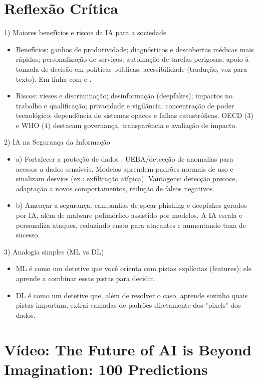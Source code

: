 \documentclass[a4paper,12pt]{article}
\begin{document}
\section{Reflexão Crítica}

1) Maiores benefícios e riscos da IA para a sociedade
\begin{itemize}
\item Benefícios: ganhos de produtividade; diagnósticos e descobertas médicas mais rápidos; personalização de serviços; automação de tarefas perigosas; apoio à tomada de decisão em políticas públicas; acessibilidade (tradução, voz para texto). Em linha com \cite{oecd2019} e \cite{who2021}.
\item Riscos: vieses e discriminação; desinformação (deepfakes); impactos no trabalho e qualificação; privacidade e vigilância; concentração de poder tecnológico; dependência de sistemas opacos e falhas catastróficas. OECD (3) e WHO (4) destacam governança, transparência e avaliação de impacto.
\end{itemize}

2) IA na Segurança da Informação
\begin{itemize}
\item a) Fortalecer a proteção de dados \cite{stamp2022}: UEBA/detecção de anomalias para acessos a dados sensíveis. Modelos aprendem padrões normais de uso e sinalizam desvios (ex.: exfiltração atípica). Vantagens: detecção precoce, adaptação a novos comportamentos, redução de falsos negativos.
\item b) Ameaçar a segurança: campanhas de spear‑phishing e deepfakes gerados por IA, além de malware polimórfico assistido por modelos. A IA escala e personaliza ataques, reduzindo custo para atacantes e aumentando taxa de sucesso.
\end{itemize}

3) Analogia simples (ML vs DL)
\begin{itemize}
\item ML é como um detetive que você orienta com pistas explícitas (features); ele aprende a combinar essas pistas para decidir.
\item DL é como um detetive que, além de resolver o caso, aprende sozinho quais pistas importam, extrai camadas de padrões diretamente dos "pixels" dos dados.
\end{itemize}

\section{Vídeo: The Future of AI is Beyond Imagination: 100 Predictions \cite{youtube2024}}
\end{document}

